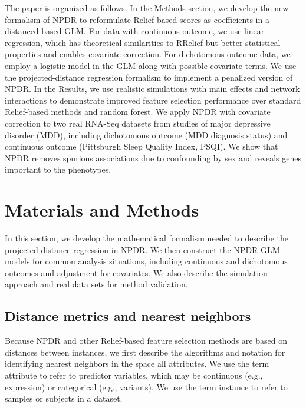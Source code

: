 \documentclass[10pt]{article}
\begin{document}

The paper is organized as follows.
In the Methods section, we develop the new formalism of NPDR to reformulate Relief-based scores as coefficients in a distanced-based GLM.
For data with continuous outcome, we use linear regression, which has theoretical similarities to RRelief but better statistical properties and enables covariate correction.
For dichotomous outcome data, we employ a logistic model in the GLM along with possible covariate terms.
We use the projected-distance regression formalism to implement a penalized version of NPDR. 
In the Results, we use realistic simulations with main effects and network interactions to demonstrate improved feature selection performance over standard Relief-based methods and random forest. 
We apply NPDR with covariate correction to two real RNA-Seq datasets from studies of major depressive disorder (MDD), including dichotomous outcome (MDD diagnosis status) and continuous outcome (Pittsburgh Sleep Quality Index, PSQI).
We show that NPDR removes spurious associations due to confounding by sex and reveals genes important to the phenotypes.



\section{Materials and Methods}
In this section, we develop the mathematical formalism needed to describe the projected distance regression in NPDR. We then construct the NPDR GLM models for common analysis situations, including continuous and dichotomous outcomes and adjustment for covariates. We also describe the simulation approach and real data sets for method validation. 

\def\ri{R_i}
\def\rj{R_j}
\def\kmi{k_{M_i}}
\def\khi{k_{H_i}}
\def\hji{H_{j_i}}
\def\ma{\overline{M}_a}
\def\ha{\overline{H}_a}
\def\mnu{M_\nu}
\def\hnu{H_\nu}
\def\myd{\text{diff}}
\def\ka{\bar{k}_\alpha}

\subsection{Distance metrics and nearest neighbors}\label{sec:reform}
Because NPDR and other Relief-based feature selection methods are based on distances between instances, we first describe the algorithms and notation for identifying nearest neighbors in the space all attributes. We use the term attribute to refer to predictor variables, which may be continuous (e.g., expression) or categorical (e.g., variants). We use the term instance to refer to samples or subjects in a dataset.  
\end{document}
